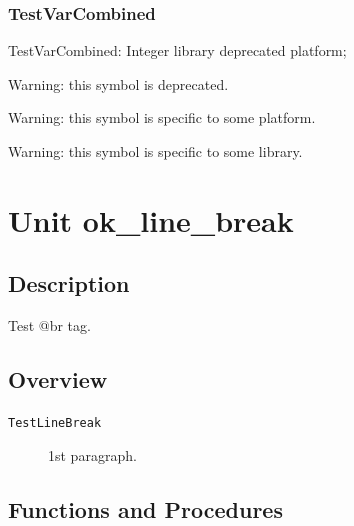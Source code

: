 \documentclass{report}
\begin{document}
\subsection*{TestVarCombined}
\begin{list}{}{
\setlength{\itemindent}{0cm}
\setlength{\listparindent}{0cm}
\setlength{\leftmargin}{\evensidemargin}
\addtolength{\leftmargin}{\tmplength}
\settowidth{\labelsep}{X}
\addtolength{\leftmargin}{\labelsep}
\setlength{\labelwidth}{\tmplength}
}
\begin{flushleft}
\item[\textbf{Declaration}\hfill]
\begin{ttfamily}
TestVarCombined: Integer library deprecated platform;\end{ttfamily}


\end{flushleft}
\par
\item[\textbf{Description}]
Warning: this symbol is deprecated.

Warning: this symbol is specific to some platform.

Warning: this symbol is specific to some library.

 

\end{list}
\chapter{Unit ok{\_}line{\_}break}
\section{Description}
Test @br tag.
\section{Overview}
\begin{description}
\item[\texttt{TestLineBreak}]1st paragraph.
\end{description}
\section{Functions and Procedures}
\end{document}
